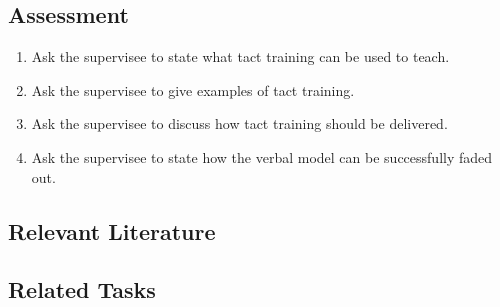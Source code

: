 \subsection{Assessment}
\begin{enumerate}
\item Ask the supervisee to state what tact training can be used to teach.
\item Ask the supervisee to give examples of tact training.
\item Ask the supervisee to discuss how tact training should be delivered.
\item Ask the supervisee to state how the verbal model can be successfully faded out.
\end{enumerate}
%
\subsection{Relevant Literature}
\begin{refsection}
\nocite{skinner1957verbal,
    sundberg2001benefits,
    sundberg1998teaching}
\printbibliography[heading=none]
\end{refsection}
%
\subsection{Related Tasks}
\fourdTwelve{}\\
\fourFKFourtyFive{}\\
